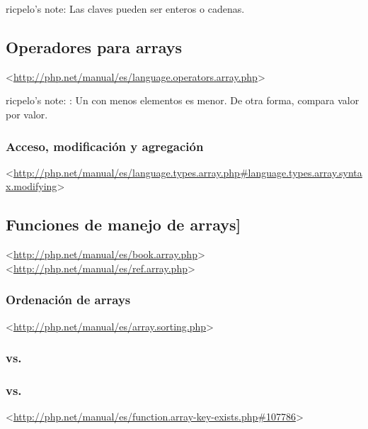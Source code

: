 \documentclass[a4paper,11pt,spanish]{sphinxmanual}
\begin{document}
ricpelo's note: Las claves pueden ser enteros o cadenas.


\subsection{Operadores para arrays}
\label{\detokenize{php:operadores-para-arrays}}
\textless{}\url{http://php.net/manual/es/language.operators.array.php}\textgreater{}

ricpelo's note: : Un  con menos elementos es
menor. De otra forma, compara valor por valor.


\subsubsection{Acceso, modificación y agregación}
\label{\detokenize{php:acceso-modificacion-y-agregacion}}
\textless{}\url{http://php.net/manual/es/language.types.array.php\#language.types.array.syntax.modifying}\textgreater{}


\subsection{Funciones de manejo de arrays{]}}
\label{\detokenize{php:funciones-de-manejo-de-arrays}}
\textless{}\url{http://php.net/manual/es/book.array.php}\textgreater{}
\textless{}\url{http://php.net/manual/es/ref.array.php}\textgreater{}


\subsubsection{Ordenación de arrays}
\label{\detokenize{php:ordenacion-de-arrays}}
\textless{}\url{http://php.net/manual/es/array.sorting.php}\textgreater{}


\subsubsection{}
\label{\detokenize{php:print-r}}

\subsubsection{ vs. }
\label{\detokenize{php:vs-array-merge}}

\subsubsection{ vs. }
\label{\detokenize{php:isset-vs-array-key-exists}}
\textless{}\url{http://php.net/manual/es/function.array-key-exists.php\#107786}\textgreater{}
\end{document}
